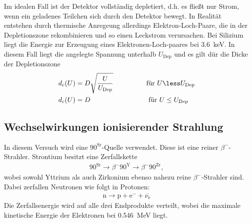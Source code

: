 Im idealen Fall ist der Detektor vollständig depletiert, d.h. es fließt nur Strom,
wenn ein geladenes Teilchen sich durch den Detektor bewegt. In Realität entstehen
durch thermische Anregeung allerdings Elektron-Loch-Paare, die in der Depletionszone
rekombinieren und so einen Leckstrom verursachen. Bei Silizium liegt die Energie
zur Erzeugung eines Elektronen-Loch-paares bei \SI{3.6}{\kilo\electronvolt}.
In diesem Fall liegt die angelegte Spannung unterhalb $U_\text{Dep}$ und es gilt
dür die Dicke der Depletionszone
\begin{align}
  d_\text{c}(U) &= D\sqrt{\frac{U}{U_\text{Dep}}} \hspace{1.7cm}\text{für } U \less U_\text{Dep} \\
  d_\text{c}(U) &= D \hspace{3cm}\text{für } U \le U_\text{Dep}
\end{align}


\subsection{Wechselwirkungen ionisierender Strahlung}
In diesem Versuch wird eine ${90}^\text{Sr}$-Quelle verwendet. Diese ist eine reiner
$\beta^{-}$-Strahler. Strontium besitzt eine Zerfallskette
\begin{align}
  {90}^\text{Sr} \rightarrow{\beta^{-}} {90}^\text{Y} \rightarrow{\beta^{-}} {90}^\text{Zr},
\end{align}
wobei sowohl Yttrium als auch Zirkonium ebenso nahezu reine $\beta^{-}$-Strahler
sind.
 Dabei zerfallen Neutronen wie folgt in Protonen:
\begin{align}
  \text{n} \rightarrow \text{p} + \text{e}^{-} + \overline{\nu_\text{e}}
\end{align}
Die Zerfallsenergie wird auf alle drei Endprodukte verteilt, wobei die maximale
kinetische Energie der Elektronen bei \SI{0.546}{\mega\electronvolt} liegt.


